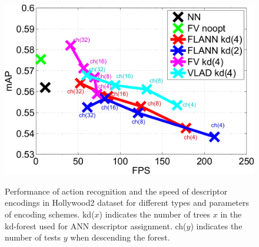 \documentclass[10pt,twocolumn,letterpaper]{article}
\begin{document}
\begin{figure}
\begin{center}
\mbox{}\vspace{-.4cm}\\
\includegraphics[width=.9\linewidth]{figures/hollywood2-flann-fps-map-crop-mod.pdf}
\caption{Performance of action recognition and the speed of descriptor encodings in Hollywood2 dataset for different types and parameters of encoding schemes. kd($x$) indicates the number of trees $x$ in the kd-forest used for ANN descriptor assignment. ch($y$) indicates the number of tests $y$ when descending the forest.\vspace{-.4cm}}
\label{fig:hwd2-flann}
\end{center}
\end{figure}


\end{document}
